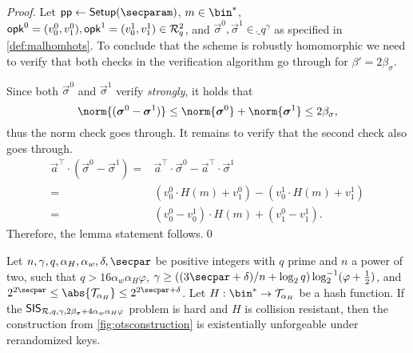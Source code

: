 \begin{proof}
  Let $\params\gets\setup(\secparam)$, $m\in\bin^*$, $\mathsf{opk}^0=(v^0_0,v^0_1),\mathsf{opk}^1=(v^1_0,v^1_1)\in \mathcal{R}^2_q$, and $\vec{\sigma}^0,\vec{\sigma}^1 \in \ring_q^\gamma$ as specified in \autoref{def:malhomhots}.
  To conclude that the scheme is robustly homomorphic we need to verify that both checks in the verification algorithm go through for $\beta'=2\beta_\sigma$.
  
  Since both $\vec{\sigma}^0$ and $\vec{\sigma}^1$ verify \emph{strongly}, it holds that
  \begin{equation*}
     \norm{(\vec{\sigma}^0-\vec{\sigma}^1)}
    \leq \norm{\vec{\sigma}^0}+\norm{\vec{\sigma}^1}
    \leq 2\beta_\sigma,
  \end{equation*}
  thus the norm check goes through.
  It remains to verify that the second check also goes through.
  \begin{align*}
     \vec{a}^\intercal\cdot (\vec{\sigma}^0-\vec{\sigma}^1)
    ={}& \vec{a}^\intercal\cdot \vec{\sigma}^0- \vec{a}^\intercal\cdot\vec{\sigma}^1\\
    ={}& (v^0_0\cdot H(m) + v^0_1) - (v^1_0\cdot H(m) + v^1_1)\tag{Def of $\sverify$}\\
    ={}& (v^0_0-v^1_0)\cdot H(m) + (v^0_1-v^1_1).
  \end{align*}
  Therefore, the lemma statement follows.\qed
\end{proof}


\begin{lemma}\label{lem:kots_sis}
  Let $n,\gamma,q,\alpha_H,\alpha_w,\delta,\secpar$ be positive integers with $q$ prime and $n$ a power of two, such that $q > 16 \alpha_w \alpha_H\varphi$, $\gamma\geq((3\secpar+\delta)/n+\log_2q)\log^{-1}_2(\varphi+\tfrac{1}{2})$, and $2^{2\secpar} \leq \abs{\tern_{\alpha_H}} \leq 2^{2\secpar + \delta}$.
  Let $H : \bin^* \to \tern_{\alpha_H}$ be a hash function.
  If the $\mathsf{SIS}_{\mathcal{R},q,\gamma,2\beta_\sigma + 4\alpha_w\alpha_H\varphi}$ problem is hard and $H$ is collision resistant, then the construction from \autoref{fig:otsconstruction} is existentially unforgeable under rerandomized keys.
\end{lemma}

